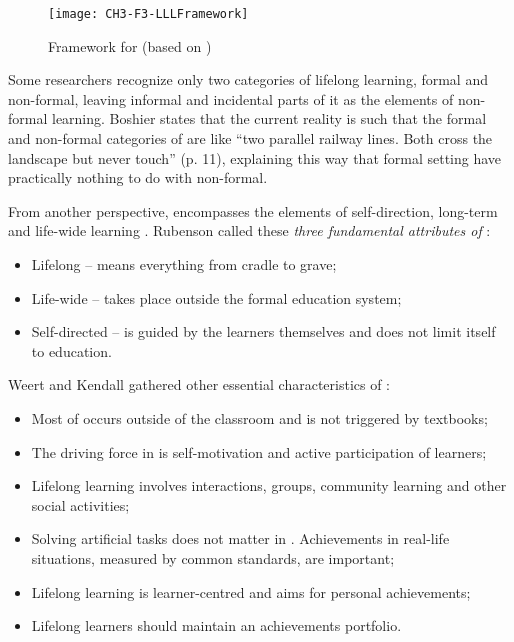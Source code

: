 \begin{figure}[htb]
\centering
\texttt{[image: CH3-F3-LLLFramework]}
\caption[Framework for \LLLc]{Framework for \LLLc (based on
\citealp[p.~11]{Divjak2004})}
\label{fig:lllfmwrk}
\end{figure}

Some researchers \citep{Longworth2003} recognize only two categories of lifelong
learning, formal and non-formal, leaving informal and incidental parts of it as
the elements of non-formal learning. Boshier \citeyearpar{Boshier2000} states
that the current reality is such that the formal and non-formal categories of
\LLLs are like ``two parallel railway lines. Both cross the landscape but never
touch'' (p. 11), explaining this way that formal setting have practically
nothing to do with non-formal. 

From another perspective, \LLLs encompasses the elements of self-direction,
long-term and life-wide learning \citep{Schuetze2006}. Rubenson
\citeyearpar{Rubenson2002} called these \textit{three fundamental attributes of \LLLs}:

\begin{itemize}
  \item Lifelong -- means everything from cradle to grave;
  \item Life-wide -- takes place outside the formal education system;
  \item Self-directed -- is guided by the learners themselves and does not
  limit itself to education.
\end{itemize} 

Weert and Kendall \citeyearpar{Kendall2004} gathered other essential
characteristics of \LLLsn:

\begin{itemize}
  \item Most of \LLLs occurs outside of the classroom and is not triggered by
  textbooks;
  \item The driving force in \LLLs is self-motivation and active participation
  of learners;
  \item Lifelong learning involves interactions, groups, community learning and
  other social activities;
  \item Solving artificial tasks does not matter in \LLLsn. Achievements in
  real-life situations, measured by common standards, are important;
  \item Lifelong learning is learner-centred and aims for personal
  achievements;
  \item Lifelong learners should maintain an achievements portfolio.
\end{itemize} 

